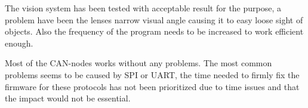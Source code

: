 The vision system has been tested with acceptable result for the purpose, a problem have been the lenses narrow visual angle causing it to easy loose sight of objects. Also the frequency of the program needs to be increased to work efficient enough.

Most of the CAN-nodes works without any problems. The most common problems seems to be caused by SPI or UART, the time needed to firmly fix the firmware for these protocols has not been prioritized due to time issues and that the impact would not be essential.
